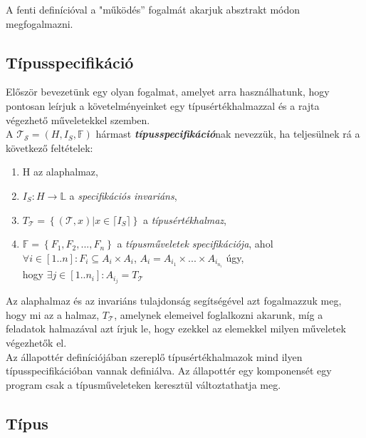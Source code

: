 \documentclass[12pt,margin=0px]{article}
\begin{document}
	\noindent A fenti definícióval a "működés” fogalmát akarjuk absztrakt módon megfogalmazni.
	
	\subsection*{Típusspecifikáció}
			
	Először bevezetünk egy olyan fogalmat, amelyet arra használhatunk, hogy pontosan
	leírjuk a követelményeinket egy típusértékhalmazzal és a rajta végezhető
	műveletekkel szemben.\\
	
	\noindent A $\mathcal{T_{S}}=(H,I_{S},\mathbb{F})$ hármast \emph{\textbf{típusspecifikáció}}nak nevezzük, ha
	teljesülnek rá a következő feltételek:
	
	\begin{enumerate}
		\item H az alaphalmaz,
		
		\item $I_{S} : H \to \mathbb{L} $ a \emph{specifikációs invariáns},
	
		\item $T_{\mathcal{T}} = \left\{ {(\mathcal{T},x) | x \in \lceil I_{S}} \rceil\right\}$ a \emph{típusértékhalmaz},
		
		\item $\mathbb{F} = \left\{ {F_{1},F_{2},...,F_{n}}\right\}$ a \emph{típusműveletek specifikációja}, ahol\\
		$\forall i \in [1..n]: F_{i} \subseteq A_{i} \times A_{i}$, $A_{i} = A_{i_{1}} \times ... \times A_{i_{n_{i}}}$ úgy,\\
		hogy $\exists j \in [1..n_{i}]: A_{i_{j}} = T_{\mathcal{T}} $
	\end{enumerate}
	
    \noindent Az alaphalmaz és az invariáns tulajdonság segítségével azt fogalmazzuk meg, hogy mi az a halmaz, $T_{\mathcal{T}}$, amelynek elemeivel foglalkozni akarunk, míg a feladatok halmazával azt írjuk le, hogy ezekkel az elemekkel milyen műveletek végezhetők el.\\
	
	\noindent Az állapottér definíciójában szereplő típusértékhalmazok mind ilyen típusspecifikációban
	vannak definiálva. Az állapottér egy komponensét egy program csak a típusműveleteken keresztül változtathatja meg.

\newpage	
\subsection*{Típus}
\end{document}
